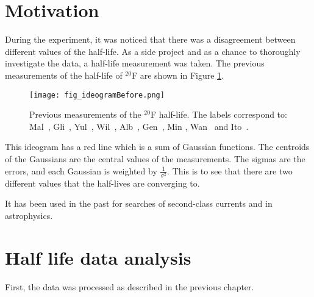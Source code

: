 

\section{Motivation}
During the experiment, it was noticed that there was a disagreement between different values of the half-life.
As a side project and as a chance to thoroughly investigate the data, a half-life measurement was taken. 
The previous measurements of the half-life of $^{20}$F are shown in Figure \ref{fig:IDBefore}.

\begin{figure}[!htb]
	\centerline{\texttt{[image: fig\_ideogramBefore.png]}}
	\caption{Previous measurements of  the $^{20}$F half-life.
		 The labels correspond to: Mal~\cite{Mal62}, Gli~\cite{Gli63},
		Yul~\cite{Yul67}, Wil~\cite{Wil70}, Alb~\cite{Alb75}, Gen~\cite{Gen76},
		Min \cite{Min87}, Wan~\cite{Wan92} and Ito~\cite{Ito95}.}
	\label{fig:IDBefore}
\end{figure}

This ideogram has a red line which is a sum of Gaussian functions.
The centroids of the Gaussians are the central values of the measurements.
The sigmas are the errors, and each Gaussian is weighted by $\frac{1}{\sigma^{2}}$.
This is to see that there are two different values that the half-lives are converging to.

It has been used in the past for searches of second-class currents and in astrophysics.

\section{Half life data analysis}
\label{sec:analysis}
First, the data was processed as described in the previous chapter.

